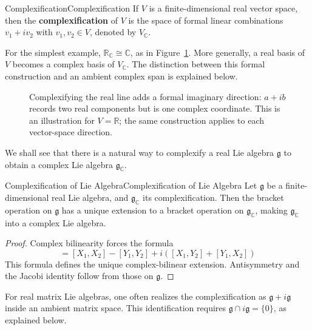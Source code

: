 \documentclass[../main.tex]{subfiles}
\begin{document}
\begin{definition}{Complexification}{Complexification}
  If $V$ is a finite-dimensional real vector space, then the \textbf{complexification} of $V$ is the space of formal linear combinations $v_1 + i v_2$ with $v_1, v_2 \in V$, denoted by $V_\mathbb{C}$.
\end{definition}


For the simplest example, $\mathbb R_{\mathbb C}\cong\mathbb C$, as in Figure~\ref{fig:complexification-real-and-imaginary}. More generally, a real basis of $V$ becomes a complex basis of $V_{\mathbb C}$. The distinction between this formal construction and an ambient complex span is explained below.

\begin{figure}[H]
    \centering
    \caption{Complexifying the real line adds a formal imaginary direction: $a+ib$ records two real components but is one complex coordinate. This is an illustration for $V=\mathbb R$; the same construction applies to each vector-space direction.}
    \label{fig:complexification-real-and-imaginary}
\end{figure}

We shall see that there is a natural way to complexify a real Lie algebra $\mathfrak{g}$ to obtain a complex Lie algebra $\mathfrak{g}_\mathbb{C}$.
\begin{proposition}{Complexification of Lie Algebra}{Complexification of Lie Algebra}
  Let $\mathfrak{g}$ be a finite-dimensional real Lie algebra, and $\mathfrak{g}_\mathbb{C}$ its complexification. Then the bracket operation on $\mathfrak{g}$ has a unique extension to a bracket operation on $\mathfrak{g}_\mathbb{C}$, making $\mathfrak{g}_\mathbb{C}$ into a complex Lie algebra.
\end{proposition}
\begin{proof}
  Complex bilinearity forces the formula
  \begin{equation*}
    [X_1 + i Y_1, X_2 + i Y_2] = [X_1, X_2] - [Y_1, Y_2] + i([X_1, Y_2] + [Y_1, X_2])
  \end{equation*}
  This formula defines the unique complex-bilinear extension. Antisymmetry and the Jacobi identity follow from those on $\mathfrak{g}$.
\end{proof}

For real matrix Lie algebras, one often realizes the complexification as $\mathfrak{g}+i\mathfrak{g}$ inside an ambient matrix space. This identification requires $\mathfrak{g}\cap i\mathfrak{g}=\{0\}$, as explained below.
\end{document}
